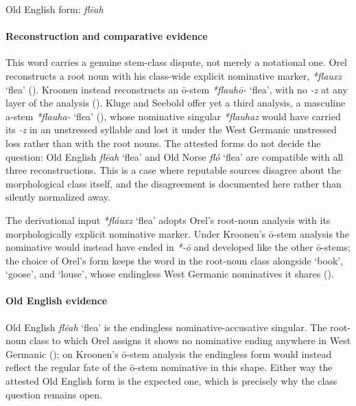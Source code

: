 \documentclass[
  british,
  a4paper,
]{article}
\providecommand{\Recon}[1]{\emph{*#1}}
\begin{document}
Old English form: \emph{flēah}

\paragraph{Reconstruction and comparative
evidence}\label{reconstruction-and-comparative-evidence-19}

This word carries a genuine stem-class dispute, not merely a notational
one. Orel reconstructs a root noun with his class-wide explicit
nominative marker, \emph{*flauxz} `flea' (). Kroonen instead reconstructs an ō-stem {\emph{*flauhō-}}
`flea', with no \emph{-z} at any layer of the analysis
(). Kluge and Seebold offer
yet a third analysis, a masculine a-stem {\emph{*flauha-}} `flea'
(), whose nominative
singular \emph{*flauhaz} would have carried its \emph{-z} in an
unstressed syllable and lost it under the West Germanic unstressed loss
rather than with the root nouns. The attested forms do not decide the
question: Old English \emph{flēah} `flea' and Old Norse \emph{fló}
`flea' are compatible with all three reconstructions. This is a case
where reputable sources disagree about the morphological class itself,
and the disagreement is documented here rather than silently normalized
away.

The derivational input \Recon{fláuxz} `flea' adopts Orel's root-noun
analysis with its morphologically explicit nominative marker. Under
Kroonen's ō-stem analysis the nominative would instead have ended in
\emph{*-ō} and developed like the other ō-stems; the choice of Orel's
form keeps the word in the root-noun class alongside `book', `goose',
and `louse', whose endingless West Germanic nominatives it shares
().

\paragraph{Old English evidence}\label{old-english-evidence-19}

Old English {\emph{flēah}} `flea' is the endingless
nominative-accusative singular. The root-noun class to which Orel
assigns it shows no nominative ending anywhere in West Germanic
(); on
Kroonen's ō-stem analysis the endingless form would instead reflect the
regular fate of the ō-stem nominative in this shape. Either way the
attested Old English form is the expected one, which is precisely why
the class question remains open.
\end{document}
